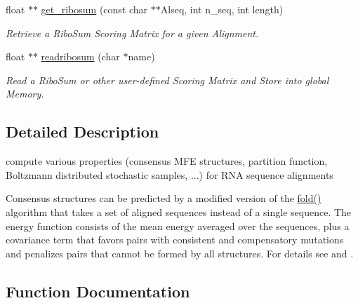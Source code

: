 \begin{DoxyCompactItemize}
\item 
float $\ast$$\ast$ \hyperlink{group__consensus__fold_ga1116aed4b2dab5252cd23946d47d52c3}{get\+\_\+ribosum} (const char $\ast$$\ast$Alseq, int n\+\_\+seq, int length)\hypertarget{group__consensus__fold_ga1116aed4b2dab5252cd23946d47d52c3}{}\label{group__consensus__fold_ga1116aed4b2dab5252cd23946d47d52c3}

\begin{DoxyCompactList}\small\item\em Retrieve a Ribo\+Sum Scoring Matrix for a given Alignment. \end{DoxyCompactList}\item 
float $\ast$$\ast$ \hyperlink{group__consensus__fold_ga5e125c9586fcd4e2e1559fe76f7289cc}{readribosum} (char $\ast$name)\hypertarget{group__consensus__fold_ga5e125c9586fcd4e2e1559fe76f7289cc}{}\label{group__consensus__fold_ga5e125c9586fcd4e2e1559fe76f7289cc}

\begin{DoxyCompactList}\small\item\em Read a Ribo\+Sum or other user-\/defined Scoring Matrix and Store into global Memory. \end{DoxyCompactList}\end{DoxyCompactItemize}


\subsection{Detailed Description}
compute various properties (consensus M\+FE structures, partition function, Boltzmann distributed stochastic samples, ...) for R\+NA sequence alignments 

Consensus structures can be predicted by a modified version of the \hyperlink{group__mfe__fold__single_gaadafcb0f140795ae62e5ca027e335a9b}{fold()} algorithm that takes a set of aligned sequences instead of a single sequence. The energy function consists of the mean energy averaged over the sequences, plus a covariance term that favors pairs with consistent and compensatory mutations and penalizes pairs that cannot be formed by all structures. For details see \cite{hofacker:2002} and \cite{bernhart:2008}. 

\subsection{Function Documentation}
